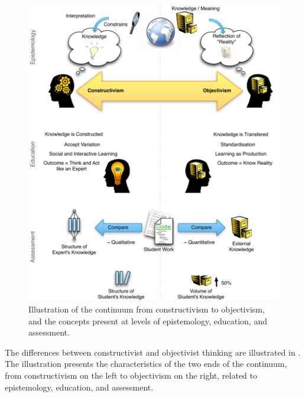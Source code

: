 \begin{figure}[htpb]
	\centering 
	\includegraphics[width=\textwidth]{ConstructivismObjectivism}
	\caption{Illustration of the continuum from constructivism to objectivism, and the concepts present at levels of epistemology, education, and assessment.}
	\label{fig:const_obj}
\end{figure} 

The differences between constructivist and objectivist thinking are illustrated in . The illustration presents the characteristics of the two ends of the continuum, from constructivism on the left to objectivism on the right, related to epistemology, education, and assessment. 

